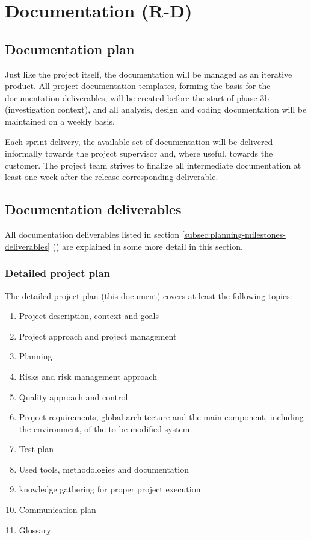 
\section{Documentation (R-D)}
\label{sec:documentation}
\subsection{Documentation plan}
Just like the project itself, the documentation will be managed as an iterative product.
All project documentation templates, forming the basis for the documentation deliverables, will be created before the start of phase 3b (investigation context), and all analysis, design and coding documentation will be maintained on a weekly basis.

Each sprint delivery, the available set of documentation will be delivered informally towards the project supervisor and, where useful, towards the customer.
The project team strives to finalize all intermediate documentation at least one week after the release corresponding deliverable.

\subsection{Documentation deliverables}
All documentation deliverables listed in section \ref{subsec:planning-milestones-deliverables} () are explained in some more detail in this section.

\subsubsection{Detailed project plan}
The detailed project plan (this document) covers at least the following topics:

	\begin{enumerate}
		\item Project description, context and goals
		\item Project approach and project management
		\item Planning
		\item Risks and risk management approach
		\item Quality approach and control
		\item Project requirements, global architecture and the main component, including the environment, of the to be modified system
		\item Test plan
		\item Used tools, methodologies and documentation
		\item knowledge gathering for proper project execution
		\item Communication plan
		\item Glossary
	\end {enumerate}

